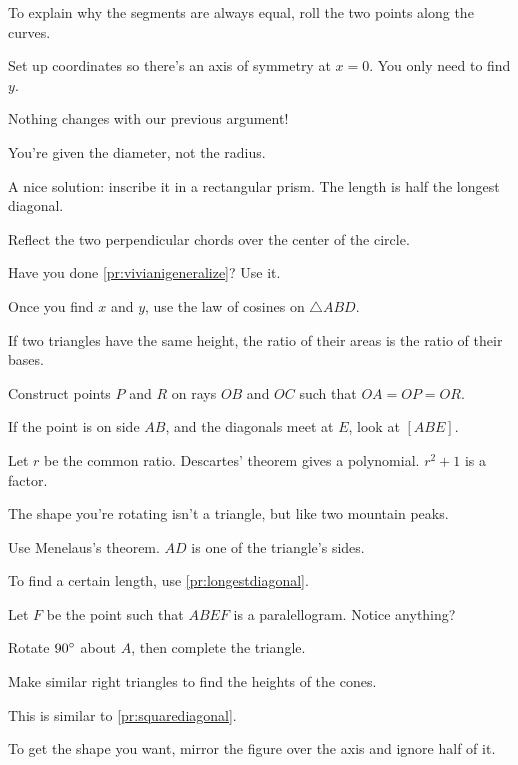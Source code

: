 \documentclass[11pt,paper=letter]{scrartcl}
\begin{document}
\begin{enumthin}[leftmargin=0pt]
\item \label{h:np23} To explain why the segments are always equal, roll the two points along the curves.
\item \label{h:pc52} Set up coordinates so there's an axis of symmetry at $x = 0$. You only need to find $y$.
\item \label{h:np03} Nothing changes with our previous argument!
\item \label{h:an31} You're given the diameter, not the radius.
\item \label{h:gbe3} A nice solution: inscribe it in a rectangular prism. The length is half the longest diagonal.
\item \label{h:os41} Reflect the two perpendicular chords over the center of the circle. 
\item \label{h:vt51} Have you done \autoref{pr:vivianigeneralize}? Use it.
\item \label{h:pt53} Once you find $x$ and $y$, use the law of cosines on $\triangle ABD$.
\item \label{h:cv01} If two triangles have the same height, the ratio of their areas is the ratio of their bases.
\item \label{h:gbf3} Construct points $P$ and $R$ on rays $OB$ and $OC$ such that $OA = OP = OR$. 
\item \label{h:gb72} If the point is on side $AB$, and the diagonals meet at $E$, look at $[ABE]$.
\item \label{h:dt23} Let $r$ be the common ratio. Descartes' theorem gives a polynomial. $r^2 + 1$ is a factor.
\item \label{h:pc51} The shape you're rotating isn't a triangle, but like two mountain peaks.
\item \label{h:rt04} Use Menelaus's theorem. $AD$ is one of the triangle's sides.
\item \label{h:eq31} To find a certain length, use \autoref{pr:longestdiagonal}.
\item \label{h:gba2} Let $F$ be the point such that $ABEF$ is a paralellogram. Notice anything?
\item \label{h:pt42} Rotate $90^\circ$ about $A$, then complete the triangle.
\item \label{h:pc43} Make similar right triangles to find the heights of the cones.
\item \label{h:rd52} This is similar to \autoref{pr:squarediagonal}.
\item \label{h:pc50} To get the shape you want, mirror the figure over the axis and ignore half of it.

\end{enumthin}
\end{document}
